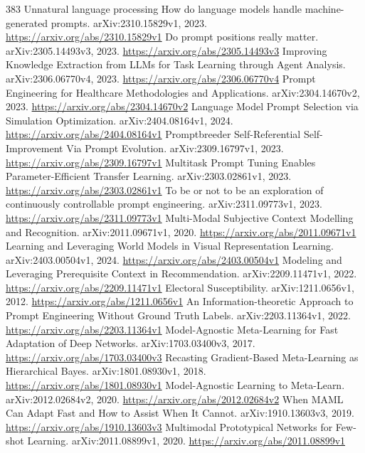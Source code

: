 \documentclass[11pt]{article}
\begin{document}
\begin{thebibliography}{383}
 Unnatural language processing How do language models handle machine-generated prompts. arXiv:2310.15829v1, 2023. \url{https://arxiv.org/abs/2310.15829v1}
 Do prompt positions really matter. arXiv:2305.14493v3, 2023. \url{https://arxiv.org/abs/2305.14493v3}
 Improving Knowledge Extraction from LLMs for Task Learning through Agent Analysis. arXiv:2306.06770v4, 2023. \url{https://arxiv.org/abs/2306.06770v4}
 Prompt Engineering for Healthcare Methodologies and Applications. arXiv:2304.14670v2, 2023. \url{https://arxiv.org/abs/2304.14670v2}
 Language Model Prompt Selection via Simulation Optimization. arXiv:2404.08164v1, 2024. \url{https://arxiv.org/abs/2404.08164v1}
 Promptbreeder Self-Referential Self-Improvement Via Prompt Evolution. arXiv:2309.16797v1, 2023. \url{https://arxiv.org/abs/2309.16797v1}
 Multitask Prompt Tuning Enables Parameter-Efficient Transfer Learning. arXiv:2303.02861v1, 2023. \url{https://arxiv.org/abs/2303.02861v1}
 To be or not to be an exploration of continuously controllable prompt engineering. arXiv:2311.09773v1, 2023. \url{https://arxiv.org/abs/2311.09773v1}
 Multi-Modal Subjective Context Modelling and Recognition. arXiv:2011.09671v1, 2020. \url{https://arxiv.org/abs/2011.09671v1}
 Learning and Leveraging World Models in Visual Representation Learning. arXiv:2403.00504v1, 2024. \url{https://arxiv.org/abs/2403.00504v1}
 Modeling and Leveraging Prerequisite Context in Recommendation. arXiv:2209.11471v1, 2022. \url{https://arxiv.org/abs/2209.11471v1}
 Electoral Susceptibility. arXiv:1211.0656v1, 2012. \url{https://arxiv.org/abs/1211.0656v1}
 An Information-theoretic Approach to Prompt Engineering Without Ground Truth Labels. arXiv:2203.11364v1, 2022. \url{https://arxiv.org/abs/2203.11364v1}
 Model-Agnostic Meta-Learning for Fast Adaptation of Deep Networks. arXiv:1703.03400v3, 2017. \url{https://arxiv.org/abs/1703.03400v3}
 Recasting Gradient-Based Meta-Learning as Hierarchical Bayes. arXiv:1801.08930v1, 2018. \url{https://arxiv.org/abs/1801.08930v1}
 Model-Agnostic Learning to Meta-Learn. arXiv:2012.02684v2, 2020. \url{https://arxiv.org/abs/2012.02684v2}
 When MAML Can Adapt Fast and How to Assist When It Cannot. arXiv:1910.13603v3, 2019. \url{https://arxiv.org/abs/1910.13603v3}
 Multimodal Prototypical Networks for Few-shot Learning. arXiv:2011.08899v1, 2020. \url{https://arxiv.org/abs/2011.08899v1}

\end{thebibliography}
\end{document}
